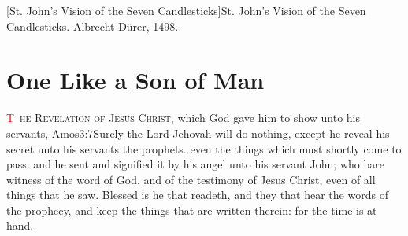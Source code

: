[St. John's Vision of the Seven Candlesticks]{St. John's Vision of the Seven Candlesticks. Albrecht Dürer, 1498.}

\mainmatter
\trimFrame
\chapter{One Like a Son of Man}
\fancyhead{} %
\pagestyle{fancy}
\begingroup
\let\clearpage\relax
\endgroup
\lettrine[lines=3,nindent=-0.3em,loversize=0.05]{\textcolor{red}{T}}{\ he Revelation of Jesus Christ}, which God gave him to show unto his servants,%
			{Amos}{3:7}{Surely the Lord Jehovah will do nothing, except he reveal his secret unto his servants the prophets.}
 even the things which must shortly come to pass: and he sent and signified it by his angel unto his servant John; %
who bare witness of the word of God, and of the testimony of Jesus Christ, even of all things that he saw. %
Blessed is he that readeth, and they that hear the words of the prophecy, and keep the things that are written therein: for the time is at hand.
